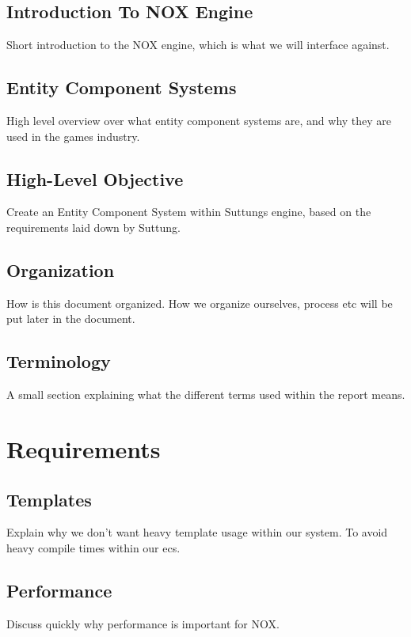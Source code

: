 \section{Introduction To NOX Engine}
Short introduction to the NOX engine, which is what we will interface against.

\section{Entity Component Systems}
High level overview over what entity component systems are, and why they are used in the games industry.

\section{High-Level Objective}
Create an Entity Component System within Suttungs engine,
based on the requirements laid down by Suttung.

\section{Organization}
How is this document organized.
How we organize ourselves, process etc will be put later in the document.

\section{Terminology}
A small section explaining what the different terms used within the report means.

\chapter{Requirements}
\label{chap:requirements}

\section{Templates}
Explain why we don't want heavy template usage within our system.
To avoid heavy compile times within our ecs.

\section{Performance}
Discuss quickly why performance is important for NOX.

